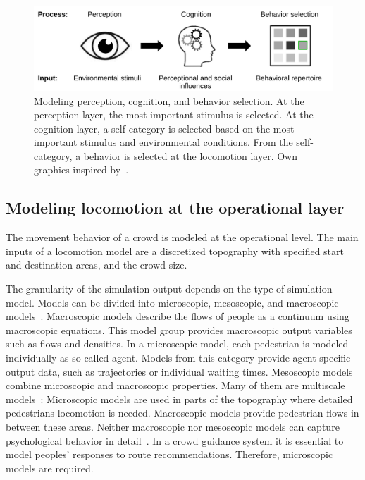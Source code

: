 \begin{figure}[hbt!]
\centering
\includegraphics[width=1\textwidth]{../figures/state-of-the-art/crowds/perceptioncognigion.pdf} 
\caption[]{Modeling perception, cognition, and behavior selection.  At the perception layer, the most important stimulus is selected. At the cognition layer, a self-category is selected based on the most important stimulus and environmental conditions. From the self-category, a behavior is selected at the locomotion layer. Own graphics inspired by~\cite[p.89]{kleinmeier-2021-cdyn}.}
\label{fig:perceptioncognition}
\end{figure}




\FloatBarrier




\subsection{Modeling locomotion at the operational layer}

The movement behavior of a crowd is modeled at the operational level. The main inputs of a  locomotion model are a discretized topography with specified start and destination areas, and the crowd size. 

The granularity of the simulation output depends on the type of simulation model. Models can be divided into microscopic, mesoscopic, and macroscopic models~\cite{adrian-2019-cdyn}. Macroscopic models describe the flows of people as a continuum using macroscopic equations. This model group provides macroscopic output variables such as flows and densities. In a microscopic model, each pedestrian is modeled individually as so-called agent. Models from this category provide agent-specific output data, such as trajectories or individual waiting times. 
Mesoscopic models combine microscopic and macroscopic properties. Many of them are multiscale models~\cite{borrmann-2012-cdyn}:
Microscopic models are used in parts of the topography where detailed pedestrians locomotion is needed. Macroscopic models provide pedestrian flows in between these areas. 
Neither macroscopic nor mesoscopic models can capture psychological behavior in detail~\cite{kleinmeier-2021-cdyn}. In a crowd guidance system it is essential to model peoples' responses to route recommendations. Therefore, microscopic models are required. 

